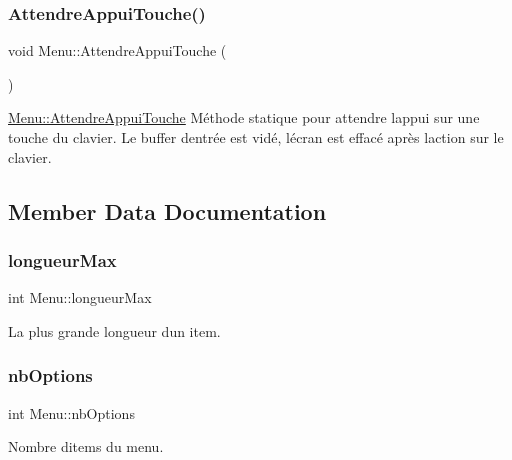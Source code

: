 \subsubsection{\texorpdfstring{Attendre\+Appui\+Touche()}{AttendreAppuiTouche()}}
{\footnotesize\ttfamily void Menu\+::\+Attendre\+Appui\+Touche (\begin{DoxyParamCaption}{ }\end{DoxyParamCaption})\hspace{0.3cm}{\ttfamily [static]}}



\hyperlink{class_menu_a6ddcaabf2fedb30f5136f3be655d60ce}{Menu\+::\+Attendre\+Appui\+Touche}  Méthode statique pour attendre l\textquotesingle{}appui sur une touche du clavier. Le buffer d\textquotesingle{}entrée est vidé, l\textquotesingle{}écran est effacé après l\textquotesingle{}action sur le clavier. 



\subsection{Member Data Documentation}
\mbox{\label{class_menu_a745c540589015b573d8214e1080e2a8e}} 
\subsubsection{\texorpdfstring{longueur\+Max}{longueurMax}}
{\footnotesize\ttfamily int Menu\+::longueur\+Max\hspace{0.3cm}{\ttfamily [private]}}



La plus grande longueur d\textquotesingle{}un item. 

\mbox{\label{class_menu_ad59953635d184fefcddf95015a761187}} 
\subsubsection{\texorpdfstring{nb\+Options}{nbOptions}}
{\footnotesize\ttfamily int Menu\+::nb\+Options\hspace{0.3cm}{\ttfamily [private]}}



Nombre d\textquotesingle{}items du menu. 

